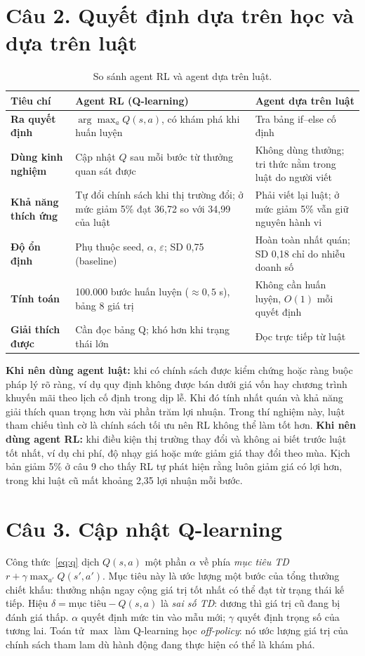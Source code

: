 \documentclass[12pt,a4paper]{report}
\begin{document}
\section*{Câu 2. Quyết định dựa trên học và dựa trên luật}
\begin{table}[H]
\centering
\small
\caption{So sánh agent RL và agent dựa trên luật.}
\begin{tabularx}{\textwidth}{>{\bfseries}p{2.8cm}XX}
\toprule
Tiêu chí & Agent RL (Q-learning) & Agent dựa trên luật \\
\midrule
Ra quyết định & $\arg\max_aQ(s,a)$, có khám phá khi huấn luyện & Tra bảng if--else cố định \\
Dùng kinh nghiệm & Cập nhật $Q$ sau mỗi bước từ thưởng quan sát được & Không dùng thưởng; tri thức nằm trong luật do người viết \\
Khả năng thích ứng & Tự đổi chính sách khi thị trường đổi; ở mức giảm 5\% đạt 36{,}72 so với 34{,}99 của luật & Phải viết lại luật; ở mức giảm 5\% vẫn giữ nguyên hành vi \\
Độ ổn định & Phụ thuộc seed, $\alpha$, $\varepsilon$; SD 0{,}75 (baseline) & Hoàn toàn nhất quán; SD 0{,}18 chỉ do nhiễu doanh số \\
Tính toán & 100.000 bước huấn luyện ($\approx0{,}5$ s), bảng 8 giá trị & Không cần huấn luyện, $O(1)$ mỗi quyết định \\
Giải thích được & Cần đọc bảng Q; khó hơn khi trạng thái lớn & Đọc trực tiếp từ luật \\
\bottomrule
\end{tabularx}
\end{table}
\textbf{Khi nên dùng agent luật:} khi có chính sách được kiểm chứng hoặc ràng buộc
pháp lý rõ ràng, ví dụ quy định không được bán dưới giá vốn hay chương trình khuyến
mãi theo lịch cố định trong dịp lễ. Khi đó tính nhất quán và khả năng giải thích
quan trọng hơn vài phần trăm lợi nhuận. Trong thí nghiệm này, luật tham chiếu tình cờ
là chính sách tối ưu nên RL không thể làm tốt hơn.
\textbf{Khi nên dùng agent RL:} khi điều kiện thị trường thay đổi và không ai biết
trước luật tốt nhất, ví dụ chi phí, độ nhạy giá hoặc mức giảm giá thay đổi theo mùa.
Kịch bản giảm 5\% ở câu 9 cho thấy RL tự phát hiện rằng luôn giảm giá có lợi hơn,
trong khi luật cũ mất khoảng 2{,}35 lợi nhuận mỗi bước.

\section*{Câu 3. Cập nhật Q-learning}
Công thức~\eqref{eq:q} dịch $Q(s,a)$ một phần $\alpha$ về phía \emph{mục tiêu TD}
$r+\gamma\max_{a'}Q(s',a')$. Mục tiêu này là ước lượng một bước của tổng thưởng
chiết khấu: thưởng nhận ngay cộng giá trị tốt nhất có thể đạt từ trạng thái kế tiếp.
Hiệu $\delta=\text{mục tiêu}-Q(s,a)$ là \emph{sai số TD}: dương thì giá trị cũ đang
bị đánh giá thấp. $\alpha$ quyết định mức tin vào mẫu mới; $\gamma$ quyết định trọng
số của tương lai. Toán tử $\max$ làm Q-learning học \emph{off-policy}: nó ước lượng
giá trị của chính sách tham lam dù hành động đang thực hiện có thể là khám phá.
\end{document}
